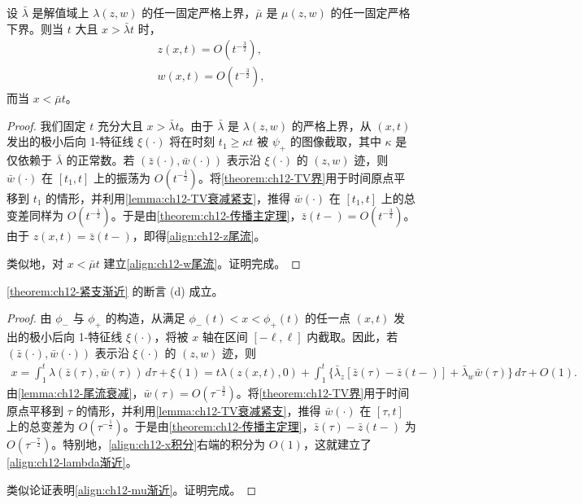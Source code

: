 \documentclass[../../main.tex]{subfiles}
\begin{document}
\begin{lemma}\label{lemma:ch12-尾流衰减}
设 $\bar\lambda$ 是解值域上 $\lambda(z,w)$ 的任一固定严格上界，$\bar\mu$ 是 $\mu(z,w)$ 的任一固定严格下界。则当 $t$ 大且 $x>\bar\lambda t$ 时，
\begin{align}
z(x,t)=O(t^{-\frac32}),
\label{align:ch12-z尾流}\\
w(x,t)=O(t^{-\frac32}),
\label{align:ch12-w尾流}
\end{align}
而当 $x<\bar\mu t$。
\end{lemma}

\begin{proof}
我们固定 $t$ 充分大且 $x>\bar\lambda t$。由于 $\bar\lambda$ 是 $\lambda(z,w)$ 的严格上界，从 $(x,t)$ 发出的极小后向 1-特征线 $\xi(\cdot)$ 将在时刻 $t_1\geqslant\kappa t$ 被 $\psi_+$ 的图像截取，其中 $\kappa$ 是仅依赖于 $\bar\lambda$ 的正常数。若 $(\bar z(\cdot),\bar w(\cdot))$ 表示沿 $\xi(\cdot)$ 的 $(z,w)$ 迹，则 $\bar w(\cdot)$ 在 $[t_1,t]$ 上的振荡为 $O(t^{-\frac12})$。将\cref{theorem:ch12-TV界}用于时间原点平移到 $t_1$ 的情形，并利用\cref{lemma:ch12-TV衰减紧支}，推得 $\bar w(\cdot)$ 在 $[t_1,t]$ 上的总变差同样为 $O(t^{-\frac12})$。于是由\cref{theorem:ch12-传播主定理}，$\bar z(t-)=O(t^{-\frac32})$。由于 $z(x,t)=\bar z(t-)$，即得\eqref{align:ch12-z尾流}。

类似地，对 $x<\bar\mu t$ 建立\eqref{align:ch12-w尾流}。证明完成。
\end{proof}

\begin{lemma}\label{lemma:ch12-渐近关系}
\cref{theorem:ch12-紧支渐近} 的断言 (d) 成立。
\end{lemma}

\begin{proof}
由 $\phi_-$ 与 $\phi_+$ 的构造，从满足 $\phi_-(t)<x<\phi_+(t)$ 的任一点 $(x,t)$ 发出的极小后向 1-特征线 $\xi(\cdot)$，将被 $x$ 轴在区间 $[-\ell,\ell]$ 内截取。因此，若 $(\bar z(\cdot),\bar w(\cdot))$ 表示沿 $\xi(\cdot)$ 的 $(z,w)$ 迹，则
\begin{align}
x=\int_1^t\lambda(\bar z(\tau),\bar w(\tau))\,d\tau+\xi(1)
=t\lambda(z(x,t),0)+\int_1^t\{\bar\lambda_z[\bar z(\tau)-\bar z(t-)]+\bar\lambda_w\bar w(\tau)\}\,d\tau+O(1).
\label{align:ch12-x积分}
\end{align}
由\cref{lemma:ch12-尾流衰减}，$\bar w(\tau)=O(\tau^{-\frac32})$。将\cref{theorem:ch12-TV界}用于时间原点平移到 $\tau$ 的情形，并利用\cref{lemma:ch12-TV衰减紧支}，推得 $\bar w(\cdot)$ 在 $[\tau,t]$ 上的总变差为 $O(\tau^{-\frac12})$。于是由\cref{theorem:ch12-传播主定理}，$\bar z(\tau)-\bar z(t-)$ 为 $O(\tau^{-\frac72})$。特别地，\eqref{align:ch12-x积分}右端的积分为 $O(1)$，这就建立了\eqref{align:ch12-lambda渐近}。

类似论证表明\eqref{align:ch12-mu渐近}。证明完成。
\end{proof}
\end{document}
